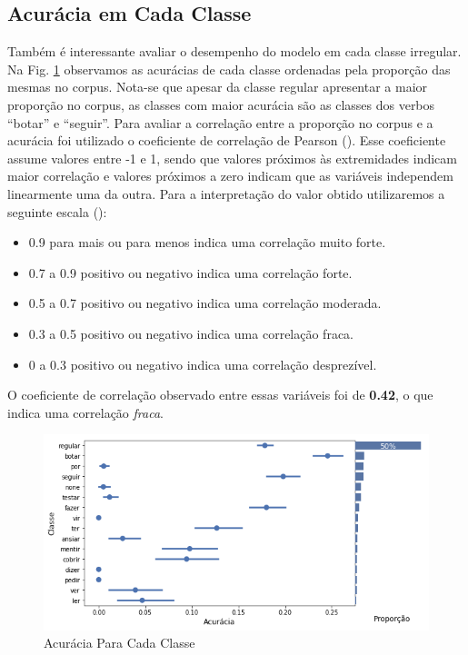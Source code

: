 \subsection{Acurácia em Cada Classe}
\label{sec:prop}

Também é interessante avaliar o desempenho do modelo em cada classe irregular. Na Fig. \ref{fig:kfoldprop} observamos as acurácias de cada classe ordenadas pela proporção das mesmas no corpus. Nota-se que apesar da classe regular apresentar a maior proporção no corpus, as classes com maior acurácia são as classes dos verbos “botar” e “seguir”. Para avaliar a correlação entre a proporção no corpus e a acurácia foi utilizado o coeficiente de correlação de Pearson (\cite{2004:bussab}). Esse coeficiente assume valores entre -1 e 1, sendo que valores próximos às extremidades indicam maior correlação e valores próximos a zero indicam que as variáveis independem linearmente uma da outra. Para a interpretação do valor obtido utilizaremos a seguinte escala (\cite{2004:bussab}):

\begin{itemize}
    \item 0.9 para mais ou para menos indica uma correlação muito forte.
    \item0.7 a 0.9 positivo ou negativo indica uma correlação forte.
    \item0.5 a 0.7 positivo ou negativo indica uma correlação moderada.
    \item0.3 a 0.5 positivo ou negativo indica uma correlação fraca.
    \item0 a 0.3 positivo ou negativo indica uma correlação desprezível.
\end{itemize}

O coeficiente de correlação observado entre essas variáveis foi de \textbf{0.42}, o que indica uma correlação \textit{fraca}. 

\begin{figure}[H]
  \centering
  \includegraphics[width=0.8\linewidth]{img/proporxacc.png}
  \caption{Acurácia Para Cada Classe}
  \label{fig:kfoldprop}
\end{figure}

